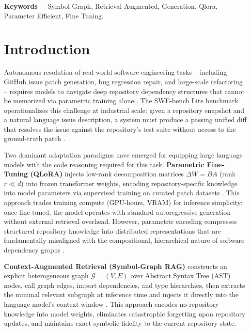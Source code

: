 \documentclass[10pt,journal,compsoc,twocolumn]{IEEEtran}
\begin{document}
\noindent\textbf{Keywords---} Symbol Graph, Retrieval Augmented, Generation, Qlora, Parameter Efficient, Fine Tuning.







\section{Introduction}


Autonomous resolution of real-world software engineering tasks -- including GitHub issue patch generation, bug regression repair, and large-scale refactoring -- requires models to navigate deep repository dependency structures that cannot be memorized via parametric training alone \cite{arxiv_2405_01543,arxiv_2501_02842}. The SWE-bench Lite benchmark operationalizes this challenge at industrial scale: given a repository snapshot and a natural language issue description, a system must produce a passing unified diff that resolves the issue against the repository's test suite without access to the ground-truth patch \cite{arxiv_2203_02155}.

Two dominant adaptation paradigms have emerged for equipping large language models with the code reasoning required for this task. \textbf{Parametric Fine-Tuning (QLoRA)} injects low-rank decomposition matrices $\Delta W = BA$ (rank $r \ll d$) into frozen transformer weights, encoding repository-specific knowledge into model parameters via supervised training on curated patch datasets \cite{arxiv_2305_18290,arxiv_2208_14227}. This approach trades training compute (GPU-hours, VRAM) for inference simplicity: once fine-tuned, the model operates with standard autoregressive generation without external retrieval overhead. However, parametric encoding compresses structured repository knowledge into distributed representations that are fundamentally misaligned with the compositional, hierarchical nature of software dependency graphs \cite{arxiv_2406_00584}.

\textbf{Context-Augmented Retrieval (Symbol-Graph RAG)} constructs an explicit heterogeneous graph $\mathcal{G} = (V, E)$ over Abstract Syntax Tree (AST) nodes, call graph edges, import dependencies, and type hierarchies, then extracts the minimal relevant subgraph at inference time and injects it directly into the language model's context window \cite{crossref_10_1145_3689096_3689462,crossref_10_18653_v1_2026_findings_acl_1933}. This approach encodes no repository knowledge into model weights, eliminates catastrophic forgetting upon repository updates, and maintains exact symbolic fidelity to the current repository state.
\end{document}
